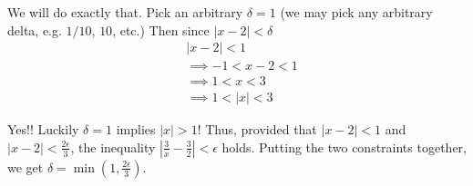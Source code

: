 We will do exactly that. Pick an arbitrary $\delta=1$ (we may pick any
arbitrary delta, e.g. $1/10$, $10$, etc.) Then since $|x-2|<\delta$
\begin{align*}
    &|x-2|<1\\
    &\implies -1<x-2<1\\
    &\implies 1<x<3\\
    &\implies 1<|x|<3
\end{align*}

Yes!! Luckily $\delta=1$ implies $|x|>1$! Thus, provided that
$|x-2|<1$ and $|x-2|<\frac{2\epsilon}{3}$, the inequality
$|\frac{3}{x}-\frac{3}{2}|<\epsilon$ holds. Putting the two constraints
together, we get $\delta=\min(1, \frac{2\epsilon}{3})$.


